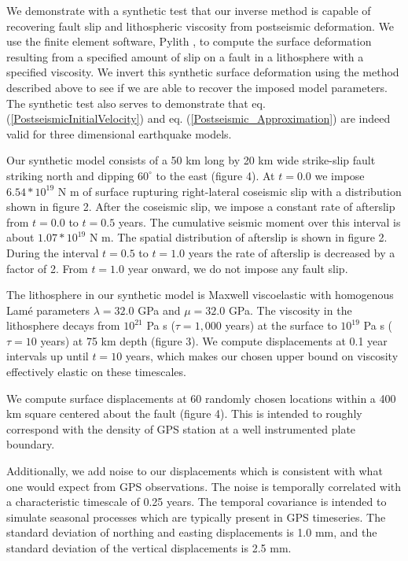 \documentclass[fleqn,12pt]{article}
\begin{document}
We demonstrate with a synthetic test that our inverse method is
capable of recovering fault slip and lithospheric viscosity from
postseismic deformation.  We use the finite element software, Pylith
\citep{A2007}, to compute the surface deformation resulting from a
specified amount of slip on a fault in a lithosphere with a specified
viscosity.  We invert this synthetic surface deformation using the
method described above to see if we are able to recover the imposed
model parameters.  The synthetic test also serves to demonstrate that
eq. (\ref{PostseismicInitialVelocity}) and
eq. (\ref{Postseismic_Approximation}) are indeed valid for three
dimensional earthquake models.

Our synthetic model consists of a 50 km long by 20 km wide strike-slip
fault striking north and dipping $60^{\circ}$ to the east (figure
4). At $t=0.0$ we impose $6.54*10^{19}$ N m of surface rupturing
right-lateral coseismic slip with a distribution shown in figure 2.
After the coseismic slip, we impose a constant rate of afterslip from
$t=0.0$ to $t=0.5$ years.  The cumulative seismic moment over this
interval is about $1.07*10^{19}$ N m.  The spatial distribution of
afterslip is shown in figure 2.  During the interval $t=0.5$ to
$t=1.0$ years the rate of afterslip is decreased by a factor of 2.
From $t=1.0$ year onward, we do not impose any fault slip.

The lithosphere in our synthetic model is Maxwell viscoelastic with
homogenous Lam\'e parameters $\lambda = 32.0$ GPa and $\mu = 32.0$
GPa.  The viscosity in the lithosphere decays from $10^{21}$ Pa s
($\tau=1,000$ years) at the surface to $10^{19}$ Pa s ($\tau=10$
years) at 75 km depth (figure 3).  We compute displacements at 0.1
year intervals up until $t=10$ years, which makes our chosen upper bound on
viscosity effectively elastic on these timescales.

We compute surface displacements at 60 randomly chosen locations
within a 400 km square centered about the fault (figure 4).  This is
intended to roughly correspond with the density of GPS station at a
well instrumented plate boundary.

Additionally, we add noise to our displacements which is consistent
with what one would expect from GPS observations.  The noise is
temporally correlated with a characteristic timescale of 0.25 years.
The temporal covariance is intended to simulate seasonal processes
which are typically present in GPS timeseries.  The standard deviation
of northing and easting displacements is 1.0 mm, and the standard
deviation of the vertical displacements is 2.5 mm.
\end{document}
